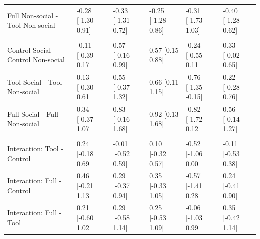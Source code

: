 \documentclass[
  man,
  floatsintext,
  longtable,
  nolmodern,
  notxfonts,
  notimes,
  colorlinks=true,linkcolor=blue,citecolor=blue,urlcolor=blue]{apa7}
\begin{document}
\begin{supptbl}[H]
\begin{minipage}{\linewidth}
\begin{tabular}{llllll}
\hspace{1em}Full Non-social - Tool Non-social & -0.28 [-1.30 0.91] & -0.33 [-1.31 0.72] & -0.25 [-1.28 0.86] & -0.31 [-1.73 1.03] & -0.40 [-1.28 0.62]\\
\addlinespace[0.3em]
\multicolumn{6}{l}{\textbf{Effect of task type}}\\
\hspace{1em}Control Social - Control Non-social & -0.11 [-0.39 0.17] & 0.57 [-0.16 0.99] & 0.57 [0.15 0.88] & -0.24 [-0.55 0.11] & 0.33 [-0.02 0.65]\\
\hspace{1em}Tool Social - Tool Non-social & 0.13 [-0.30 0.61] & 0.55 [-0.37 1.32] & 0.66 [0.11 1.15] & -0.76 [-1.35 -0.15] & 0.22 [-0.28 0.76]\\
\hspace{1em}Full Social - Full Non-social & 0.34 [-0.37 1.07] & 0.83 [-0.16 1.68] & 0.92 [0.13 1.68] & -0.82 [-1.72 0.12] & 0.56 [-0.14 1.27]\\
\addlinespace[0.3em]
\multicolumn{6}{l}{\textbf{Interaction effect}}\\
\hspace{1em}Interaction: Tool - Control & 0.24 [-0.18 0.69] & -0.01 [-0.52 0.59] & 0.10 [-0.32 0.57] & -0.52 [-1.06 0.00] & -0.11 [-0.53 0.38]\\
\hspace{1em}Interaction: Full - Control & 0.46 [-0.21 1.13] & 0.29 [-0.37 0.94] & 0.35 [-0.33 1.05] & -0.57 [-1.41 0.28] & 0.24 [-0.41 0.90]\\
\hspace{1em}Interaction: Full - Tool & 0.21 [-0.60 1.02] & 0.29 [-0.58 1.14] & 0.25 [-0.53 1.09] & -0.06 [-1.03 0.99] & 0.35 [-0.42 1.14]\\
\bottomrule
\end{tabular}
\endgroup{}

\end{minipage}%

\end{supptbl}%

\newpage
\end{document}
